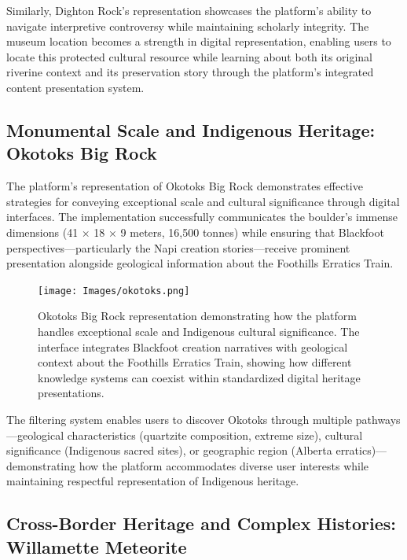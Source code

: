 Similarly, Dighton Rock's representation showcases the platform's ability to navigate interpretive controversy while maintaining scholarly integrity. The museum location becomes a strength in digital representation, enabling users to locate this protected cultural resource while learning about both its original riverine context and its preservation story through the platform's integrated content presentation system.

\subsection{Monumental Scale and Indigenous Heritage: Okotoks Big Rock}
\label{subsec:monumental_scale}

The platform's representation of Okotoks Big Rock demonstrates effective strategies for conveying exceptional scale and cultural significance through digital interfaces. The implementation successfully communicates the boulder's immense dimensions (41 × 18 × 9 meters, 16,500 tonnes) while ensuring that Blackfoot perspectives—particularly the Napi creation stories—receive prominent presentation alongside geological information about the Foothills Erratics Train.

\begin{figure}[htbp]
    \centering
    \texttt{[image: Images/okotoks.png]}
    \caption{Okotoks Big Rock representation demonstrating how the platform handles exceptional scale and Indigenous cultural significance. The interface integrates Blackfoot creation narratives with geological context about the Foothills Erratics Train, showing how different knowledge systems can coexist within standardized digital heritage presentations.}
    \label{fig:okotoks_representation}
\end{figure}

The filtering system enables users to discover Okotoks through multiple pathways—geological characteristics (quartzite composition, extreme size), cultural significance (Indigenous sacred sites), or geographic region (Alberta erratics)—demonstrating how the platform accommodates diverse user interests while maintaining respectful representation of Indigenous heritage.

\subsection{Cross-Border Heritage and Complex Histories: Willamette Meteorite}
\label{subsec:cross_border_heritage}

